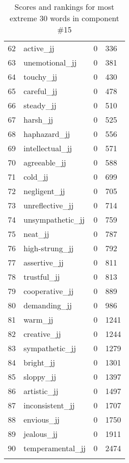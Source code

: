 \begin{longtable}[!htbp]{| rlr@{.}l |}
    62 & active\_jj & 0 & 336 \\
    63 & unemotional\_jj & 0 & 381 \\
    64 & touchy\_jj & 0 & 430 \\
    65 & careful\_jj & 0 & 478 \\
    66 & steady\_jj & 0 & 510 \\
    67 & harsh\_jj & 0 & 525 \\
    68 & haphazard\_jj & 0 & 556 \\
    69 & intellectual\_jj & 0 & 571 \\
    70 & agreeable\_jj & 0 & 588 \\
    71 & cold\_jj & 0 & 699 \\
    72 & negligent\_jj & 0 & 705 \\
    73 & unreflective\_jj & 0 & 714 \\
    74 & unsympathetic\_jj & 0 & 759 \\
    75 & neat\_jj & 0 & 787 \\
    76 & high-strung\_jj & 0 & 792 \\
    77 & assertive\_jj & 0 & 811 \\
    78 & trustful\_jj & 0 & 813 \\
    79 & cooperative\_jj & 0 & 889 \\
    80 & demanding\_jj & 0 & 986 \\
    81 & warm\_jj & 0 & 1241 \\
    82 & creative\_jj & 0 & 1244 \\
    83 & sympathetic\_jj & 0 & 1279 \\
    84 & bright\_jj & 0 & 1301 \\
    85 & sloppy\_jj & 0 & 1397 \\
    86 & artistic\_jj & 0 & 1497 \\
    87 & inconsistent\_jj & 0 & 1707 \\
    88 & envious\_jj & 0 & 1750 \\
    89 & jealous\_jj & 0 & 1911 \\
    90 & temperamental\_jj & 0 & 2474 \\
    \hline
    \caption{Scores and rankings for most extreme 30 words in component \#15} \\
\end{longtable}
